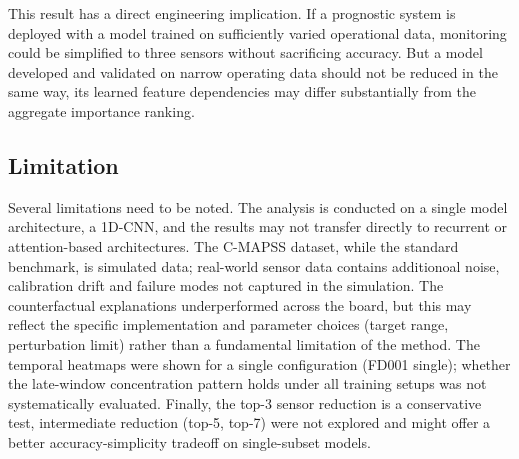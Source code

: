 This result has a direct engineering implication. If a prognostic system is deployed with a model trained on sufficiently varied operational data, monitoring could be simplified to three sensors without sacrificing accuracy. But a model developed and validated on narrow operating data should not be reduced in the same way, its learned feature dependencies may differ substantially from the aggregate importance ranking.

\subsection{Limitation}
Several limitations need to be noted. The analysis is conducted on a single model architecture, a 1D-CNN, and the results may not transfer directly to recurrent or attention-based architectures. The C-MAPSS dataset, while the standard benchmark, is simulated data; real-world sensor data contains additionoal noise, calibration drift and failure modes not captured in the simulation. The counterfactual explanations underperformed across the board, but this may reflect the specific implementation and parameter choices (target range, perturbation limit) rather than a fundamental limitation of the method. The temporal heatmaps were shown for a single configuration (FD001 single); whether the late-window concentration pattern holds under all training setups was not systematically evaluated. Finally, the top-3 sensor reduction is a conservative test, intermediate reduction (top-5, top-7) were not explored and might offer a better accuracy-simplicity tradeoff on single-subset models.




